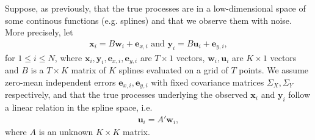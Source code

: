 \documentclass[preprint]{imsart}
\numberwithin{equation}{section}
\theoremstyle{plain}
\newcommand{\cN}{\mathcal{N}}
\newcommand{\tr}[1]{{\textcolor{red}{#1}}}
\newcommand{\by}{\mathbf{y}}
\newcommand{\bx}{\mathbf{x}}
\newcommand{\bw}{\mathbf{w}}
\newcommand{\bu}{\mathbf{u}}
\newcommand{\be}{\mathbf{e}}
\begin{document}


Suppose, as previously, that the true processes are in a low-dimensional space of some continous functions (e.g. splines) and that we observe them with noise. More precisely, let
\begin{align}\label{eq:definitions-xy}
  \bx_i = B\bw_i + \be_{x,i} \text{\ \ and\ \ } \by_i = B\bu_i + \be_{y,i},
\end{align}
for $1 \leq i \leq N$, where $\bx_i,\by_i,\be_{x,i},\be_{y,i}$ are $T \times 1$ vectors, $\bw_i, \bu_i$ are $K \times 1$ vectors and $B$ is a $T \times K$ matrix of $K$ splines evaluated on a grid of $T$ points. We assume zero-mean independent errors $\be_{x,i},\be_{y,i}$ with fixed covariance matrices $\Sigma_X,\Sigma_Y$ respectively, and that the true processes underlying the observed $\bx_i$ and $\by_i$ follow a linear relation in the spline space, i.e.
\begin{align}\label{eq:linear-xy}
  \bu_i = A'\bw_i,
\end{align}
where $A$ is an unknown $K \times K$ matrix.
\end{document}
